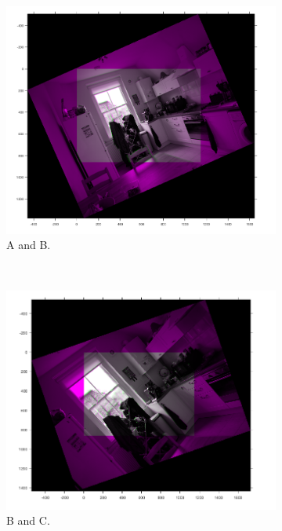 \documentclass[a4paper, 10pt, conference]{ieeeconf}
\begin{document}
\begin{figure}[!ht]
  \captionsetup[subfigure]{position=b}
  \centering
    \begin{subfigure}{0.3\linewidth}
      \includegraphics[width=\textwidth]{pic/q2_1_b5_AB}
      \caption{A and B.}
    \end{subfigure}
    ~
    \begin{subfigure}{0.3\linewidth}
      \includegraphics[width=\textwidth]{pic/q2_1_b5_BC}
      \caption{B and C.}
    \end{subfigure}
    ~
    \begin{subfigure}{0.3\linewidth}

\end{subfigure}
\end{figure}
\end{document}
